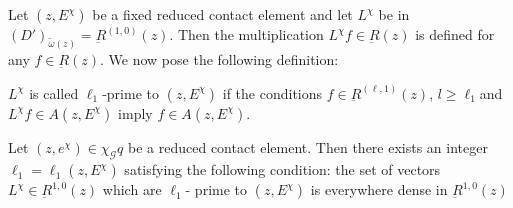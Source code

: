 \section{}\label{chap3:sec3.12}%
 
Let $(z, E^\chi)$ be a fixed reduced contact element and let $L^\chi$
be in $(D')_{\tilde{\omega}(z)}= \underbar{R}^{(1, 0)}(z)$. Then the
multiplication $L^\chi f \in \underbar{R} (z)$ is defined for any $f
\in \underbar{R}(z)$. We now pose the following definition: 

\begin{defi*}
  $L^\chi $ is called $\ell_1$-prime to $(z, E^\chi)$ if the
  conditions $f \in \underbar{R}^{(\ell, 1)}(z)$, $l \geq \ell_1$\pageoriginale and
  $L^\chi f \in A(z, E^\chi)$ imply $f \in A (z, E^\chi)$. 
\end{defi*} 
 
\begin{proposition}\label{chap3:sec3.12:prop21}%
  Let $(z, e^\chi ) \in \chi_{\mathscr{G}} q$ be a reduced contact
  element. Then there exists an integer $\ell_1= \ell_1 (z, E^\chi)$
  satisfying the following condition: the set of vectors $L^\chi \in
  \underbar{R}^{1,0}(z)$ which are $\ell_1$- prime to $(z, E^\chi)$ is
  everywhere dense in $\underbar{R}^{1,0}(z)$ 
\end{proposition} 
 
